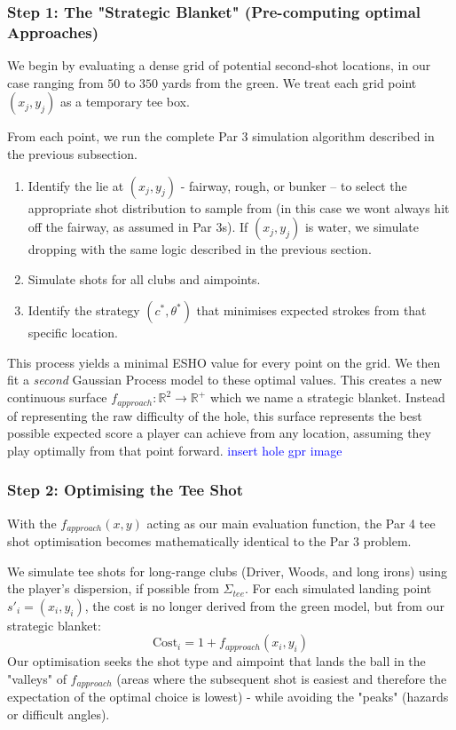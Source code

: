 \documentclass[11pt, letterpaper]{article}
\begin{document}
\subsubsection{Step 1: The "Strategic Blanket" (Pre-computing optimal Approaches)}
We begin by evaluating a dense grid of potential second-shot locations, in our case ranging from $50$ to $350$ yards from the green. We treat each grid point $(x_j, y_j)$ as a temporary tee box.

From each point, we run the complete Par 3 simulation algorithm described in the previous subsection.
\begin{enumerate}
    \item Identify the lie at $(x_j, y_j)$ - fairway, rough, or bunker –  to select the appropriate shot distribution to sample from (in this case we wont always hit off the fairway, as assumed in Par 3s). If $(x_j, y_j)$ is water, we simulate dropping with the same logic described in the previous section.
    \item Simulate shots for all clubs and aimpoints.
    \item Identify the strategy $(c^*, \theta^*)$ that minimises expected strokes from that specific location.
\end{enumerate}
This process yields a minimal ESHO value for every point on the grid. We then fit a \textit{second} Gaussian Process model to these optimal values. This creates a new continuous surface $f_{approach}: \mathbb{R}^2\to \mathbb{R}^+$ which we name a strategic blanket. Instead of representing the raw difficulty of the hole, this surface represents the best possible expected score a player can achieve from any location, assuming they play optimally from that point forward.
\textcolor{blue}{insert hole gpr image}

\subsubsection{Step 2: Optimising the Tee Shot}
With the $f_{approach}(x,y)$ acting as our main evaluation function, the Par 4 tee shot optimisation becomes mathematically identical to the Par 3 problem.

We simulate tee shots for long-range clubs (Driver, Woods, and long irons) using the player's dispersion, if possible from $\Sigma_{tee}$. For each simulated landing point $s'_i = (x_i, y_i)$, the cost is no longer derived from the green model, but from our strategic blanket:
$$\text{Cost}_i = 1 + f_{approach}(x_i, y_i)$$
Our optimisation seeks the shot type and aimpoint that lands the ball in the "valleys" of $f_{approach}$ (areas where the subsequent shot is easiest and therefore the expectation of the optimal choice is lowest) - while avoiding the "peaks" (hazards or difficult angles).
\end{document}
